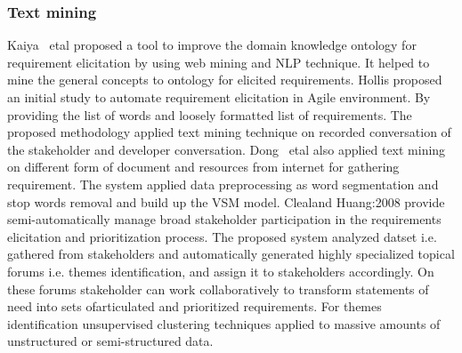 \subsubsection{Text mining} 
 Kaiya ~etal \cite {Kaiya:2010} proposed a
tool to improve the domain knowledge ontology for requirement elicitation by using web mining and NLP
technique. It helped to mine the general
concepts to ontology for elicited requirements.
Hollis \etal\cite{Hollis2017} proposed an initial study to
automate requirement elicitation in Agile environment. By providing the list of
words and loosely formatted list of requirements. The proposed methodology
applied text mining technique on recorded conversation of the stakeholder and
developer conversation. Dong ~etal \cite{dong2010} also applied text mining on
different form of document and resources from internet for gathering
requirement. The system applied data preprocessing as word segmentation and stop
words removal and build up the VSM model.  {Clealand Huang:2008} provide semi-automatically manage broad stakeholder participation in the requirements elicitation and prioritization process. 
The proposed system analyzed datset i.e. gathered from stakeholders and automatically generated highly specialized topical forums i.e. themes identification, and assign it to stakeholders accordingly.
On these forums stakeholder can work collaboratively to transform statements of need into sets ofarticulated and prioritized requirements. For themes identification unsupervised clustering
techniques applied to massive amounts of unstructured or semi-structured data. 


